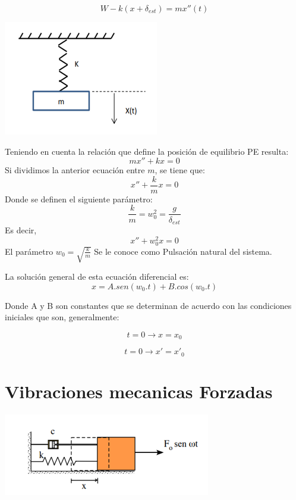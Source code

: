 \documentclass[oneside,12pt]{report}
\begin{document}
\begin{equation}\label{Ecu2}
	W-k(x+\delta_{est})=mx''(t)
\end{equation}
\begin{center}
	\includegraphics[width=0.6\linewidth]{imagen9}
\end{center}
Teniendo en cuenta la relación que define la posición de equilibrio PE resulta:
\begin{equation}
	mx''+kx=0
	\end{equation}
Si dividimos la anterior  ecuación entre $m$, se tiene que:
\begin{equation}
	x''+\frac{k}{m}x=0
\end{equation}
Donde se definen el siguiente parámetro:
\begin{equation}
	\frac{k}{m}=w_0^{2}=\frac{g}{\delta_{est}}
\end{equation}
Es decir, \begin{equation}
	x''+w_0^{2}x=0
\end{equation}
El parámetro $w_0=\sqrt{\frac{k}{m}}$ Se le conoce como Pulsación natural del sistema.


La solución general de esta ecuación diferencial es:
\begin{equation}
	x=A.sen(w_0.t)+B.cos(w_0.t)
\end{equation}

Donde A y B son constantes que se determinan de acuerdo con las condiciones
iniciales que son, generalmente:

$$t=0\longrightarrow{x}=x_0$$

$$t=0\longrightarrow{x'}=x'_0$$
\section{Vibraciones mecanicas Forzadas}
\begin{center}
	\includegraphics[width=0.7\linewidth]{imagen8}
\end{center}
\end{document}
